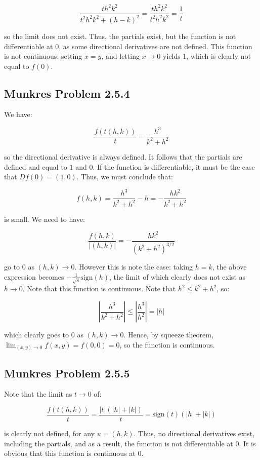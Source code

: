 \documentclass[10pt, oneside]{amsart}
\begin{document}
    $$\frac{t h^2 k^2}{t^2 h^2 k^2 + (h - k)^2} = \frac{t h^2 k^2}{t^2 h^2 k^2} = \frac{1}{t}$$

    so the limit does not exist. Thus, the partials exist, but the function is not differentiable at $0$, as some directional derivatives are not defined. This function is not continuous: setting $x = y$, and letting $x \rightarrow 0$
    yields $1$, which is clearly not equal to $f(0)$.

    \subsection{Munkres Problem 2.5.4}

    We have:

    $$\frac{f(t(h, k))}{t} = \frac{h^3}{k^2 + h^2}$$

    so the directional derivative is always defined. It follows that the partials are defined and equal to $1$ and $0$. If the function is differentiable, it must be the case that $Df(0) = (1, 0)$. Thus,
    we must conclude that:

    $$f(h, k) = \frac{h^3}{k^2 + h^2} - h = -\frac{hk^2}{k^2 + h^2}$$

    is small. We need to have:

    $$\frac{f(h, k)}{|(h, k)|} = -\frac{hk^2}{(k^2 + h^2)^{3/2}}$$

    go to $0$ as $(h, k) \rightarrow 0$. However this is note the case: taking $h = k$, the above expression becomes $-\frac{1}{\sqrt{8}}\text{sign}(h)$, the limit of which clearly does not exist as $h \rightarrow 0$.
    Note that this function is continuous. Note that $h^2 \leq k^2 + h^2$, so:

    $$\left| \frac{h^3}{k^2 + h^2} \right| \leq \left| \frac{h^3}{h^2} \right| = |h|$$

    which clearly goes to $0$ as $(h, k) \rightarrow 0$. Hence, by squeeze theorem, $\lim_{(x, y) \to 0} f(x, y) = f(0, 0) = 0$, so the function is continuous.

    \subsection{Munkres Problem 2.5.5}

    Note that the limit as $t \rightarrow 0$ of:

    $$\frac{f(t(h, k))}{t} = \frac{|t|(|h| + |k|)}{t} = \text{sign}(t) (|h| + |k|)$$

    is clearly not defined, for any $u = (h, k)$. Thus, no directional derivatives exist, including the partials, and as a result, the function is not differentiable at $0$. It is obvious
    that this function is continuous at $0$.
\end{document}
